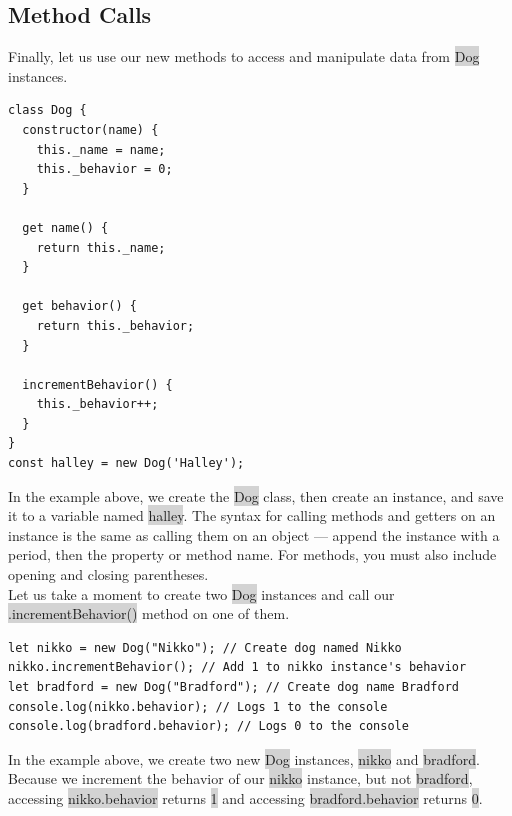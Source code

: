 \documentclass[11pt]{article}
\begin{document}
\subsection{Method Calls}
Finally, let us use our new methods to access and manipulate data from \colorbox{lightgray}{Dog} instances.
\begin{lstlisting}
class Dog {
  constructor(name) {
    this._name = name;
    this._behavior = 0;
  }

  get name() {
    return this._name;
  }

  get behavior() {
    return this._behavior;
  }   

  incrementBehavior() {
    this._behavior++;
  }
}
const halley = new Dog('Halley');
\end{lstlisting}
In the example above, we create the \colorbox{lightgray}{Dog} class, then create an instance, and save it to a variable named \colorbox{lightgray}{halley}. The syntax for calling methods and getters on an instance is the same as calling them on an object — append the instance with a period, then the property or method name. For methods, you must also include opening and closing parentheses. \\
\newline
Let us take a moment to create two \colorbox{lightgray}{Dog} instances and call our \colorbox{lightgray}{.incrementBehavior()} method on one of them. 
\begin{lstlisting}
let nikko = new Dog("Nikko"); // Create dog named Nikko
nikko.incrementBehavior(); // Add 1 to nikko instance's behavior
let bradford = new Dog("Bradford"); // Create dog name Bradford
console.log(nikko.behavior); // Logs 1 to the console
console.log(bradford.behavior); // Logs 0 to the console
\end{lstlisting}
In the example above, we create two new \colorbox{lightgray}{Dog} instances, \colorbox{lightgray}{nikko} and \colorbox{lightgray}{bradford}. Because we increment the behavior of our \colorbox{lightgray}{nikko} instance, but not \colorbox{lightgray}{bradford}, accessing \colorbox{lightgray}{nikko.behavior} returns \colorbox{lightgray}{1} and accessing \colorbox{lightgray}{bradford.behavior} returns \colorbox{lightgray}{0}.
\end{document}
